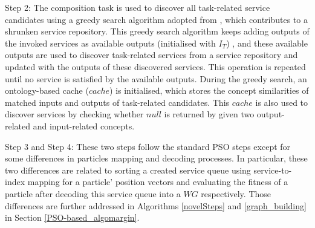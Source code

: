 \documentclass{llncs}
\begin{document}
Step 2: The composition task is used to discover all task-related service candidates using a greedy search algorithm adopted from \cite{ma2015hybrid}, which contributes to a shrunken service repository. This greedy search algorithm keeps adding outputs of the invoked services as available outputs (initialised with $I_{T}$) , and these available outputs are used to discover task-related services from a service repository and updated with the outputs of these discovered services. This operation is repeated until no service is satisfied by the available outputs. During the greedy search, an ontology-based cache ($cache$) is initialised, which stores the concept similarities of matched inputs and outputs of task-related candidates. This $cache$ is also used to discover services by checking whether $null$ is returned by given two output-related and input-related concepts.

Step 3 and Step 4: These two steps follow the standard PSO steps \cite{shi2001particle} except for some differences in particles mapping and decoding processes. In particular, these two differences are related to sorting a created service queue using service-to-index mapping for a particle' position vectors and evaluating the fitness of a particle after decoding this service queue into a $WG$ respectively. Those differences are further addressed in Algorithms \ref{novelSteps} and \ref{graph_building} in Section \ref{PSO-based_algomargin}.
\end{document}
